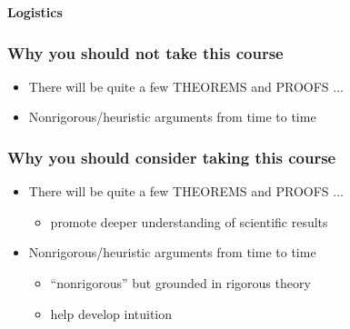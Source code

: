 \documentclass[compress,
mathserif,wide,%
]{beamer}
\begin{document}
\begin{frame}[plain]

\vfill
\begin{center}
  {\Large\bf Logistics}
\end{center}
\vfill

\end{frame}


\begin{frame}
\frametitle{Why you \alert{should not} take this course}


\begin{itemize}
  \itemsep1em
  \item<2-> There will be quite a few THEOREMS and PROOFS ...
  \pause
  \item<3-> Nonrigorous/heuristic arguments from time to time
\end{itemize}

\end{frame}






\begin{frame}
\frametitle{Why you \alert{should} consider taking this course}


\begin{itemize}
  \itemsep1em
  \item<2-> There will be quite a few THEOREMS and PROOFS ...
  \begin{itemize}
    \item<3-> promote deeper understanding of scientific results
  \end{itemize}
  
  \item<4-> Nonrigorous/heuristic arguments from time to time
  \begin{itemize}
    \vspace{0.5em}
    \item<5-> ``nonrigorous'' but grounded in rigorous theory
    \item<5-> help develop intuition
  \end{itemize}
  
\end{itemize}

\end{frame}
\end{document}
